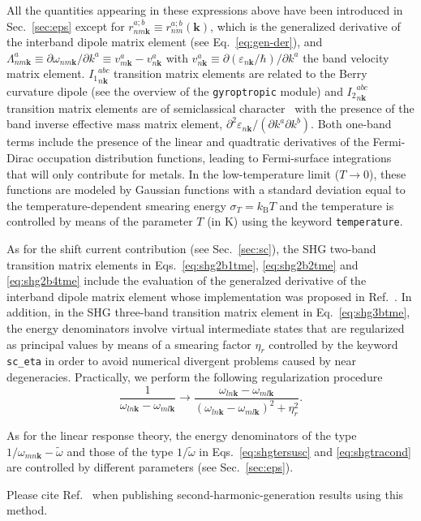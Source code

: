 All the quantities appearing in these expressions above have been introduced in Sec.~\ref{sec:eps} except for $r^{a;b}_{nm\mathbf{k}}\equiv r^{a;b}_{nm}(\mathbf{k})$, which is the generalized derivative of the interband dipole matrix element (see Eq.~\ref{eq:gen-der}), and $\Lambda^{a}_{nm\mathbf{k}}\equiv\partial\omega_{nm\mathbf{k}}/\partial k^{a}\equiv v^{a}_{m\mathbf{k}}-v^{a}_{n\mathbf{k}}$ with $v^{a}_{n\mathbf{k}}\equiv\partial(\varepsilon_{n\mathbf{k}}/\hbar)/\partial k^{a}$ the band velocity matrix element. ${I_{1}}^{abc}_{n\mathbf{k}}$ transition matrix elements are related to the Berry curvature dipole (see the overview of the \verb|gyroptropic| module) and ${I_{2}}^{abc}_{n\mathbf{k}}$ transition matrix elements are of semiclassical character~\cite{PhysRevLett.115.216806} with the presence of the band inverse effective mass matrix element, $\partial^{2}\varepsilon_{n\mathbf{k}}/(\partial k^{a}\partial k^{b})$. Both one-band terms include the presence of the linear and quadtratic derivatives of the Fermi-Dirac occupation distribution functions, leading to Fermi-surface integrations that will only contribute for metals. In the low-temperature limit ($T\to0$), these functions are modeled by Gaussian functions with a standard deviation equal to the temperature-dependent smearing energy $\sigma_{T}=k_{\mathrm{B}}T$ and the temperature is controlled by means of the parameter $T$ (in K) using the keyword {\tt temperature}.

As for the shift current contribution (see Sec.~\ref{sec:sc}), the SHG two-band transition matrix elements in Eqs.~\ref{eq:shg2b1tme}, \ref{eq:shg2b2tme} and \ref{eq:shg2b4tme} include the evaluation of the generalzed derivative of the interband dipole matrix element whose implementation was proposed in Ref.~\cite{ibanez-azpiroz_ab_2018}. In addition, in the SHG three-band transition matrix element in Eq.~\ref{eq:shg3btme}, the energy denominators involve virtual intermediate states that are regularized as principal values by means of a smearing factor $\eta_{r}$ controlled by the keyword {\tt sc\_eta} in order to avoid numerical divergent problems caused by near degeneracies. Practically, we perform the following regularization procedure
\begin{equation}
 \frac{1}{\omega_{ln\mathbf{k}}-\omega_{ml\mathbf{k}}}\to\frac{\omega_{ln\mathbf{k}}-\omega_{ml\mathbf{k}}}{\left(\omega_{ln\mathbf{k}}-\omega_{ml\mathbf{k}}\right)^{2}+\eta^{2}_{r}}.
\end{equation}

As for the linear response theory, the energy denominators of the type $1/\omega_{mn\mathbf{k}}-\tilde{\omega}$ and those of the type $1/\tilde{\omega}$ in Eqs.~\ref{eq:shgtersusc} and \ref{eq:shgtracond} are controlled by different parameters (see Sec.~\ref{sec:eps}). 

Please cite Ref.~\cite{garcia-goiricelaya-prb23} when publishing second-harmonic-generation results using this method.
